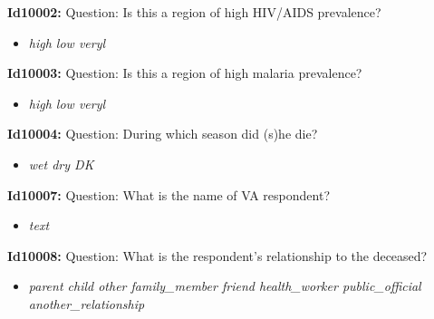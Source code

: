\documentclass{article}%
\begin{document}
%
\normalsize%
\textbf{Id10002: \newline%
}%
Question: Is this a region of high HIV/AIDS prevalence?\newline%
%
\begin{itemize}%
\item%
\textit{high\newline%
 low\newline%
 veryl\newline%
}%
\end{itemize}%
\textbf{Id10003: \newline%
}%
Question: Is this a region of high malaria prevalence?\newline%
%
\begin{itemize}%
\item%
\textit{high\newline%
 low\newline%
 veryl\newline%
}%
\end{itemize}%
\textbf{Id10004: \newline%
}%
Question: During which season did (s)he die?\newline%
%
\begin{itemize}%
\item%
\textit{wet\newline%
 dry\newline%
 DK\newline%
}%
\end{itemize}%
\textbf{Id10007: \newline%
}%
Question: What is the name of VA respondent?\newline%
%
\begin{itemize}%
\item%
\textit{text\newline%
}%
\end{itemize}%
\textbf{Id10008: \newline%
}%
Question: What is the respondent's relationship to the deceased?\newline%
%
\begin{itemize}%
\item%
\textit{parent\newline%
 child\newline%
 other\newline%
 family\_member\newline%
 friend\newline%
 health\_worker\newline%
 public\_official\newline%
 another\_relationship\newline%
}%
\end{itemize}%
\end{document}
